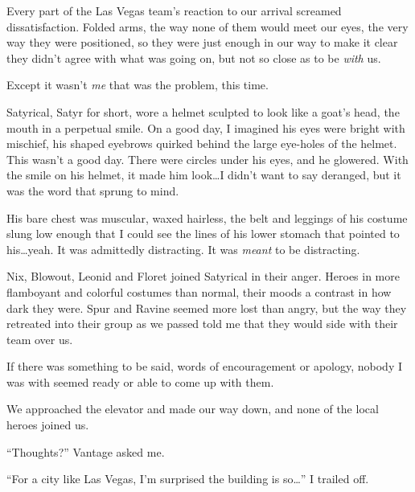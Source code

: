 





Every part of the Las Vegas team's reaction to our arrival screamed dissatisfaction.  Folded arms, the way none of them would meet our eyes, the very way they were positioned, so they were just enough in our way to make it clear they didn't agree with what was going on, but not so close as to be \emph{with} us.



Except it wasn't \emph{me} that was the problem, this time.



Satyrical, Satyr for short, wore a helmet sculpted to look like a goat's head, the mouth in a perpetual smile.  On a good day, I imagined his eyes were bright with mischief, his shaped eyebrows quirked behind the large eye-holes of the helmet.  This wasn't a good day.  There were circles under his eyes, and he glowered.  With the smile on his helmet, it made him look\ldots I didn't want to say deranged, but it was the word that sprung to mind.



His bare chest was muscular, waxed hairless, the belt and leggings of his costume slung low enough that I could see the lines of his lower stomach that pointed to his\ldots yeah.  It was admittedly distracting.  It was \emph{meant} to be distracting.



Nix, Blowout, Leonid and Floret joined Satyrical in their anger.  Heroes in more flamboyant and colorful costumes than normal, their moods a contrast in how dark they were.  Spur and Ravine seemed more lost than angry, but the way they retreated into their group as we passed told me that they would side with their team over us.



If there was something to be said, words of encouragement or apology, nobody I was with seemed ready or able to come up with them.



We approached the elevator and made our way down, and none of the local heroes joined us.



``Thoughts?'' Vantage asked me.



``For a city like Las Vegas, I'm surprised the building is so\ldots'' I trailed off.



